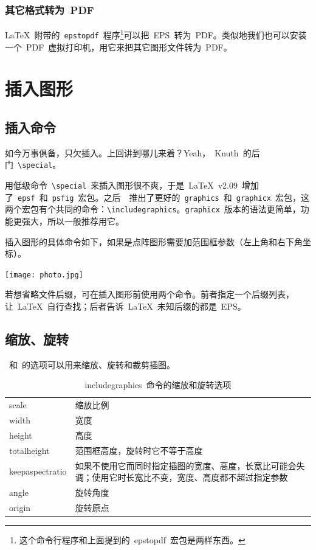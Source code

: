 \subsubsection{其它格式转为~PDF}

\LaTeX~附带的~\verb|epstopdf|~程序\footnote{这个命令行程序和上面提到的~epstopdf~宏包是两样东西。}可以把~EPS~转为~PDF。类似地我们也可以安装一个~PDF~虚拟打印机，用它来把其它图形文件转为~PDF。

\section{插入图形}
\label{sec:includegraphics}

\subsection{插入命令}
如今万事俱备，只欠插入。上回讲到哪儿来着？Yeah，~Knuth~的后门~\verb|\special|。

用低级命令~\verb|\special|~来插入图形很不爽，于是~\LaTeX~v2.09~增加了~\verb|epsf|~和~\verb|psfig|~宏包。之后~\LaTeXe~推出了更好的~\verb|graphics|~和~\verb|graphicx|~宏包，这两个宏包有个共同的命令：\verb|\includegraphics|。\verb|graphicx|~版本的语法更简单，功能更强大，所以一般推荐用它。

插入图形的具体命令如下，如果是点阵图形需要加范围框参数（左上角和右下角坐标）。

\begin{code}
\texttt{[image: photo.jpg]}
\end{code}

若想省略文件后缀，可在插入图形前使用两个命令。前者指定一个后缀列表，让~\LaTeX~自行查找；后者告诉~\LaTeX~未知后缀的都是~EPS。
\begin{code}
\end{code}

\subsection{缩放、旋转}
~和~的选项可以用来缩放、旋转和裁剪插图。

\begin{table}[htbp]
\caption{includegraphics~命令的缩放和旋转选项}
\label{tab:scale_angle}
\centering
\begin{tabularx}{350pt}{lX}
    \toprule
    scale & 缩放比例 \\
    width & 宽度 \\
    height & 高度 \\
    totalheight & 范围框高度，旋转时它不等于高度 \\
    keepaspectratio & 如果不使用它而同时指定插图的宽度、高度，长宽比可能会失调；使用它时长宽比不变，宽度、高度都不超过指定参数 \\
    angle & 旋转角度 \\
    origin & 旋转原点 \\
    \bottomrule
\end{tabularx}
\end{table}

